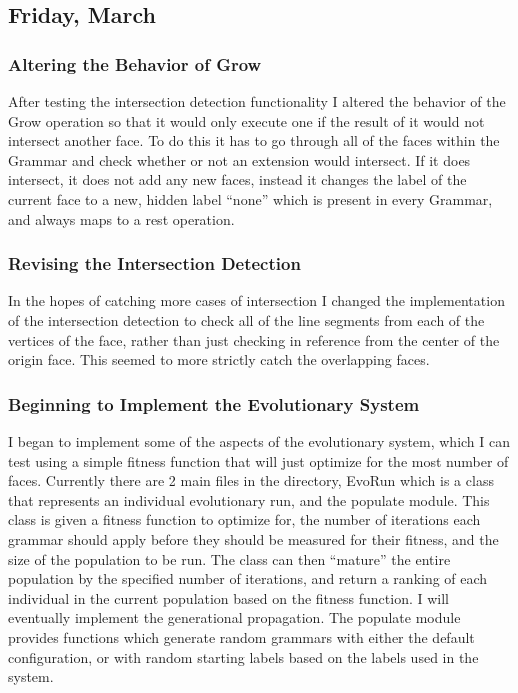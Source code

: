 \documentclass[letterpaper,oneside,titlepage]{article}
\begin{document}
\subsection{Friday, March }

\subsubsection{Altering the Behavior of Grow}
After testing the intersection detection functionality I altered the behavior of the Grow operation so that it would only execute one if the result of it would not intersect another face.  To do this it has to go through all of the faces within the Grammar and check whether or not an extension would intersect.  If it does intersect, it does not add any new faces, instead it changes the label of the current face to a new, hidden label ``none'' which is present in every Grammar, and always maps to a rest operation.

\subsubsection{Revising the Intersection Detection}
In the hopes of catching more cases of intersection I changed the implementation of the intersection detection to check all of the line segments from each of the vertices of the face, rather than just checking in reference from the center of the origin face.  This seemed to more strictly catch the overlapping faces.

\subsubsection{Beginning to Implement the Evolutionary System}
I began to implement some of the aspects of the evolutionary system, which I can test using a simple fitness function that will just optimize for the most number of faces.  Currently there are 2 main files in the directory, EvoRun which is a class that represents an individual evolutionary run, and the populate module.  This class is given a fitness function to optimize for, the number of iterations each grammar should apply before they should be measured for their fitness, and the size of the population to be run.  The class can then ``mature'' the entire population by the specified number of iterations, and return a ranking of each individual in the current population based on the fitness function.  I will eventually implement the generational propagation.  The populate module provides functions which generate random grammars with either the default configuration, or with random starting labels based on the labels used in the system.




\end{document}
